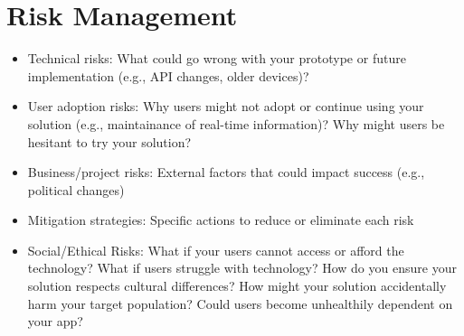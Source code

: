 \section{Risk Management}
\begin{itemize}
    \item Technical risks: What could go wrong with your prototype or future implementation (e.g., API changes, older devices)?
    \item User adoption risks: Why users might not adopt or continue using your solution (e.g., maintainance of real-time information)? Why might users be hesitant to try your solution?
    \item Business/project risks: External factors that could impact success (e.g., political changes)
    \item Mitigation strategies: Specific actions to reduce or eliminate each risk
    \item Social/Ethical Risks: What if your users cannot access or afford the technology? What if users struggle with technology? How do you ensure your solution respects cultural differences? How might your solution accidentally harm your target population? Could users become unhealthily dependent on your app?
\end{itemize}